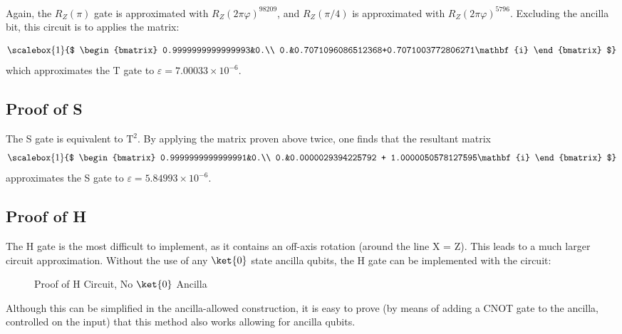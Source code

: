 \documentclass[12pt]{article}
\begin{document}
Again, the $R_Z(\pi)$ gate is approximated with $R_Z(2\pi\varphi)^{98209}$, and $R_Z(\pi/4)$ is approximated with $R_Z(2\pi\varphi)^{5796}$. Excluding the ancilla bit, this circuit is to applies the matrix:

$$
\scalebox{1}{$
\begin{bmatrix}
    0.9999999999999993&0.\\
    0.&0.7071096086512368+0.7071003772806271\mathbf{i}
\end{bmatrix}
$}
$$
which approximates the T gate to $\varepsilon = 7.00033 \times 10^{-6}$.


\subsection{Proof of S}
The S gate is equivalent to $\text{T}^2$. By applying the matrix proven above twice, one finds that the resultant matrix
$$
\scalebox{1}{$
\begin{bmatrix}
    0.9999999999999991&0.\\
    0.&0.0000029394225792 + 1.0000050578127595\mathbf{i}
\end{bmatrix}
$}
$$
approximates the S gate to $\varepsilon = 5.84993 \times 10^{-6}$.

\subsection{Proof of H}
The H gate is the most difficult to implement, as it contains an off-axis rotation (around the line X = Z). This leads to a much larger circuit approximation. Without the use of any $\ket{0}$ state ancilla qubits, the H gate can be implemented with the circuit:
\begin{figure}[ht]
    \centering
    \caption{Proof of H Circuit, No $\ket{0}$ Ancilla}
    \label{fig:quantum universal set 1 proof of H circuit}
\end{figure}

Although this can be simplified in the ancilla-allowed construction, it is easy to prove (by means of adding a CNOT gate to the ancilla, controlled on the input) that this method also works allowing for ancilla qubits.
\end{document}
